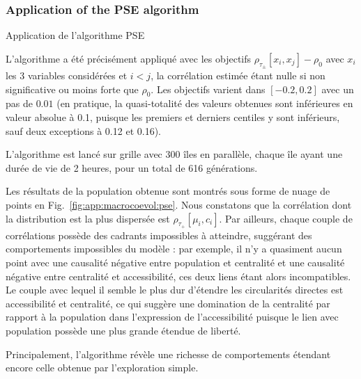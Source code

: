 \subsubsection{Application of the PSE algorithm}{Application de l'algorithme PSE}


L'algorithme a été précisément appliqué avec les objectifs $\rho_{\tau_{\pm}}\left[x_i,x_j\right] - \rho_0$ avec $x_i$ les 3 variables considérées et $i<j$, la corrélation estimée étant nulle si non significative ou moins forte que $\rho_0$. Les objectifs varient dans $\left[-0.2,0.2\right]$ avec un pas de $0.01$ (en pratique, la quasi-totalité des valeurs obtenues sont inférieures en valeur absolue à 0.1, puisque les premiers et derniers centiles y sont inférieurs, sauf deux exceptions à 0.12 et 0.16).

L'algorithme est lancé sur grille avec 300 îles en parallèle, chaque île ayant une durée de vie de 2 heures, pour un total de 616 générations.

Les résultats de la population obtenue sont montrés sous forme de nuage de points en Fig.~\ref{fig:app:macrocoevol:pse}. Nous constatons que la corrélation dont la distribution est la plus dispersée est $\rho_{\tau_+}\left[\mu_i,c_i\right]$. Par ailleurs, chaque couple de corrélations possède des cadrants impossibles à atteindre, suggérant des comportements impossibles du modèle : par exemple, il n'y a quasiment aucun point avec une causalité négative entre population et centralité et une causalité négative entre centralité et accessibilité, ces deux liens étant alors incompatibles. Le couple avec lequel il semble le plus dur d'étendre les circularités directes est accessibilité et centralité, ce qui suggère une domination de la centralité par rapport à la population dans l'expression de l'accessibilité puisque le lien avec population possède une plus grande étendue de liberté.

Principalement, l'algorithme révèle une richesse de comportements étendant encore celle obtenue par l'exploration simple.





